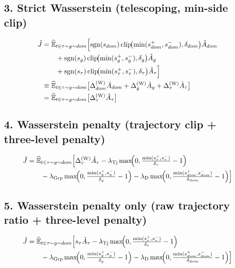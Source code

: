\documentclass{article}
\DeclareMathOperator*{\clip}{clip}
\newcommand{\Ehat}{\widehat{\mathbb{E}}}
\begin{document}
\subsection*{3. Strict Wasserstein (telescoping, min-side clip)}
\begin{align*}
\hat J
  &= \Ehat_{t \in \tau \sim g \sim dom}\Bigl[
        \operatorname{sgn}(s_{dom})\clip\!\bigl(\min(s_{dom}^{+},s_{dom}^{-}),\delta_{dom}\bigr)\hat A_{dom} \\
  &\qquad + \operatorname{sgn}(s_g)\clip\!\bigl(\min(s_g^{+},s_g^{-}),\delta_g\bigr)\hat A_g \\
  &\qquad + \operatorname{sgn}(s_\tau)\clip\!\bigl(\min(s_\tau^{+},s_\tau^{-}),\delta_\tau\bigr)\hat A_\tau
     \Bigr] \\
  &\equiv \Ehat_{t \in \tau \sim g \sim dom}\bigl[
        \Delta_{dom}^{(\text{W})}\hat A_{dom}
      + \Delta_g^{(\text{W})}\hat A_g
      + \Delta_\tau^{(\text{W})}\hat A_\tau
     \bigr] \\
  &= \Ehat_{t \in \tau \sim g \sim dom}\bigl[\Delta_\tau^{(\text{W})}\hat A_\tau\bigr]
\end{align*}

\subsection*{4. Wasserstein penalty (trajectory clip + three-level penalty)}
\begin{align*}
\hat J
  &= \Ehat_{t \in \tau \sim g \sim dom}\Bigl[
        \Delta_\tau^{(\text{W})}\hat A_\tau
      - \lambda_{\operatorname{Tj}}\max\!\Bigl(0,\tfrac{\min(s_\tau^{+},s_\tau^{-})}{\delta_\tau}-1\Bigr) \\
  &\qquad - \lambda_{\operatorname{Grp}}\max\!\Bigl(0,\tfrac{\min(s_g^{+},s_g^{-})}{\delta_g}-1\Bigr)
      - \lambda_{\text{D}}\max\!\Bigl(0,\tfrac{\min(s_{dom}^{+},s_{dom}^{-})}{\delta_{dom}}-1\Bigr)
     \Bigr]
\end{align*}

\subsection*{5. Wasserstein penalty only (raw trajectory ratio + three-level penalty)}
\begin{align*}
\hat J
  &= \Ehat_{t \in \tau \sim g \sim dom}\Bigl[
        s_\tau \hat A_\tau
      - \lambda_{\operatorname{Tj}}\max\!\Bigl(0,\tfrac{\min(s_\tau^{+},s_\tau^{-})}{\delta_\tau}-1\Bigr) \\
  &\qquad - \lambda_{\operatorname{Grp}}\max\!\Bigl(0,\tfrac{\min(s_g^{+},s_g^{-})}{\delta_g}-1\Bigr)
      - \lambda_{\text{D}}\max\!\Bigl(0,\tfrac{\min(s_{dom}^{+},s_{dom}^{-})}{\delta_{dom}}-1\Bigr)
     \Bigr]
\end{align*}
\end{document}
